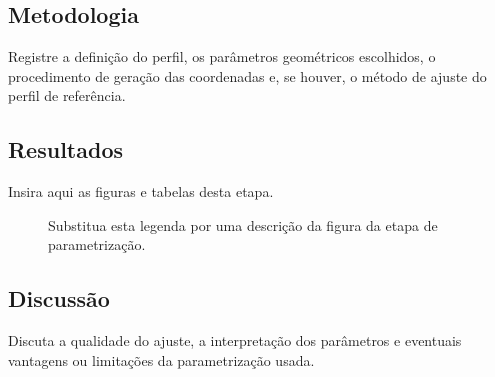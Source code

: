 \subsection{Metodologia}

Registre a definição do perfil, os parâmetros geométricos escolhidos,
o procedimento de geração das coordenadas e, se houver, o método de ajuste
do perfil de referência.

\subsection{Resultados}

Insira aqui as figuras e tabelas desta etapa.

\begin{figure}[H]
\centering
\caption{Substitua esta legenda por uma descrição da figura da etapa de
parametrização.}
\label{fig:airfoil-mod-exemplo}
\end{figure}

\subsection{Discussão}

Discuta a qualidade do ajuste, a interpretação dos parâmetros e eventuais
vantagens ou limitações da parametrização usada.
